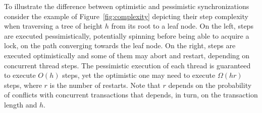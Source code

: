 To illustrate the difference between optimistic and pessimistic 
synchronizations consider the example of 
Figure~\ref{fig:complexity} depicting their step complexity when
traversing a tree of height $h$ from its root to a leaf node. On the left, 
steps are executed pessimistically, potentially spinning before being able to acquire 
a lock, on the path converging towards the leaf node. On the right, 
steps are executed optimistically and some of them
may abort and restart, depending on concurrent thread steps. The pessimistic 
execution of each thread is guaranteed to execute $O(h)$ steps, yet the optimistic one 
may need to execute $\Omega(hr)$ steps, where $r$ is the number of restarts. 
Note that $r$ depends 
on the probability of conflicts with concurrent transactions that depends, in turn, 
on the transaction length and $h$.


